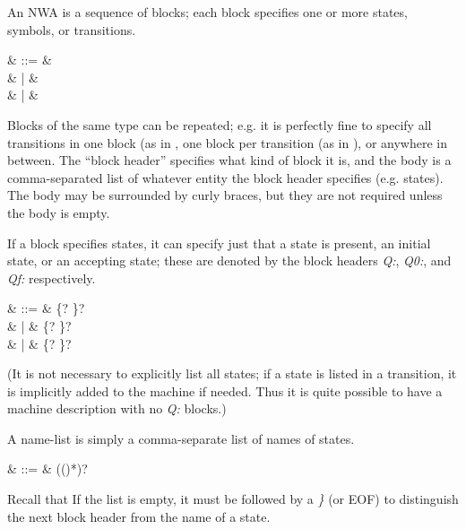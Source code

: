 An NWA is a sequence of blocks; each block specifies one or more
states, symbols, or transitions.

\begin{grammar}
   &  ::= &  \\
                  &    | &  \\
                  &    | & 
\end{grammar}

Blocks of the same type can be repeated; e.g. it is perfectly fine to
specify all transitions in one block (as in ,
one block per transition (as in ), or
anywhere in between. The ``block header'' specifies what kind of block
it is, and the body is a comma-separated list of whatever entity the
block header specifies (e.g. states). The body may be surrounded by
curly braces, but they are not required unless the body is empty.

If a block specifies states, it can specify just that a state is
present, an initial state, or an accepting state; these are denoted by
the block headers \textsl{Q:}, \textsl{Q0:}, and \textsl{Qf:}
respectively.
 
\begin{grammar}
   &  ::= &  \cfgsp \term\{? \cfgsp {}\cfgsp\term\}? \\
                        &   |  & \cfgsp \term\{? \cfgsp {}\cfgsp\term\}? \\
                        &   |  & \cfgsp \term\{? \cfgsp {}\cfgsp\term\}?
\end{grammar}

(It is not necessary to explicitly list all states; if a state is
listed in a transition, it is implicitly added to the machine if
needed. Thus it is quite possible to have a machine description with
no \textsl{Q:} blocks.)

A name-list is simply a comma-separate list of names of states.

\begin{grammar}
   & ::= & (\cfgsp (\term{,}\cfgsp  {})*)?
\end{grammar}

Recall that If the list is empty, it must be followed by a \textsl{\}}
(or EOF) to distinguish the next block header from the name of a
state.

